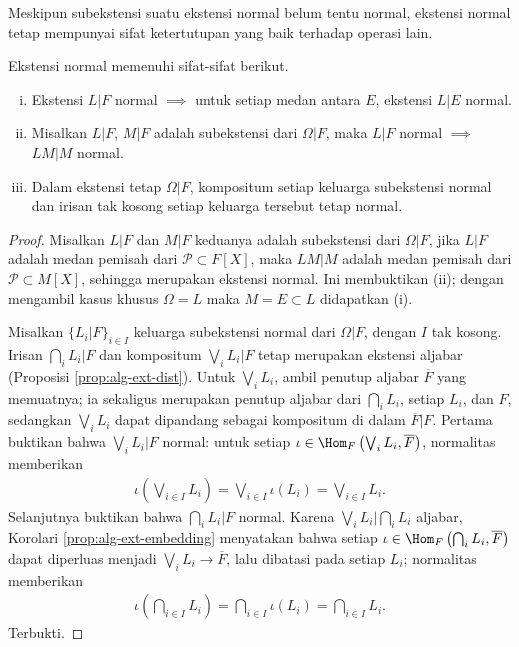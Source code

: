 Meskipun subekstensi suatu ekstensi normal belum tentu normal, ekstensi normal tetap mempunyai sifat ketertutupan yang baik terhadap operasi lain.

\begin{proposition}\label{prop:normal-ext-properties}
	Ekstensi normal memenuhi sifat-sifat berikut.
	\begin{enumerate}[(i)]
		\item Ekstensi $L|F$ normal $\implies$ untuk setiap medan antara $E$, ekstensi $L|E$ normal.
		\item Misalkan $L|F$, $M|F$ adalah subekstensi dari $\Omega|F$, maka $L|F$ normal $\implies$ $LM|M$ normal.
		\item Dalam ekstensi tetap $\Omega|F$, kompositum setiap keluarga subekstensi normal dan irisan tak kosong setiap keluarga tersebut tetap normal.
	\end{enumerate}
\end{proposition}
\begin{proof}
	Misalkan $L|F$ dan $M|F$ keduanya adalah subekstensi dari $\Omega|F$, jika $L|F$ adalah medan pemisah dari $\mathcal{P} \subset F[X]$, maka $LM|M$ adalah medan pemisah dari $\mathcal{P} \subset M[X]$, sehingga merupakan ekstensi normal. Ini membuktikan (ii); dengan mengambil kasus khusus $\Omega=L$ maka $M=E \subset L$ didapatkan (i).
	
	Misalkan $\{L_i|F\}_{i \in I}$ keluarga subekstensi normal dari $\Omega|F$, dengan $I$ tak kosong. Irisan $\bigcap_i L_i|F$ dan kompositum $\bigvee_i L_i | F$ tetap merupakan ekstensi aljabar (Proposisi \ref{prop:alg-ext-dist}). Untuk $\bigvee_i L_i$, ambil penutup aljabar $\overline{F}$ yang memuatnya; ia sekaligus merupakan penutup aljabar dari $\bigcap_i L_i$, setiap $L_i$, dan $F$, sedangkan $\bigvee_i L_i$ dapat dipandang sebagai kompositum di dalam $\overline{F}|F$. Pertama buktikan bahwa $\bigvee_i L_i|F$ normal: untuk setiap $\iota \in \Hom_F\left(\bigvee_i L_i , \overline{F}\right)$, normalitas memberikan
	\begin{gather*}
		\iota\left( \bigvee_{i \in I} L_i \right) = \bigvee_{i \in I} \iota(L_i) = \bigvee_{i \in I} L_i.
	\end{gather*}
	Selanjutnya buktikan bahwa $\bigcap_i L_i|F$ normal. Karena $\bigvee_i L_i \big| \bigcap_i L_i$ aljabar, Korolari \ref{prop:alg-ext-embedding} menyatakan bahwa setiap $\iota \in \Hom_F\left(\bigcap_i L_i , \overline{F}\right)$ dapat diperluas menjadi $\bigvee_i L_i \to \overline{F}$, lalu dibatasi pada setiap $L_i$; normalitas memberikan
	\begin{gather*}
		\iota\left( \bigcap_{i \in I} L_i \right) = \bigcap_{i \in I} \iota(L_i) = \bigcap_{i \in I} L_i.
	\end{gather*}
	Terbukti.
\end{proof}

